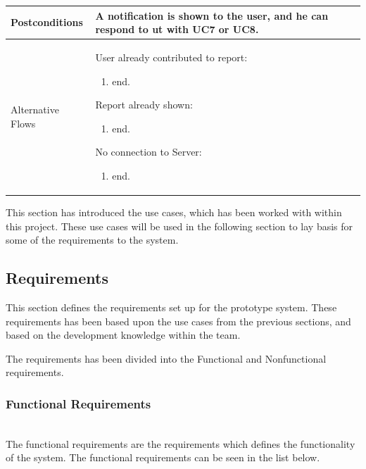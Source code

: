 \begin{table}[htb]
\begin{tabularx}{\textwidth}{|l|X|}
Postconditions    & A notification is shown to the user, and he can respond to ut with UC7 or UC8. \\ \hline
Alternative Flows & 
User already contributed to report:
{\footnotesize \begin{enumerate}
\item end.
\end{enumerate}}
Report already shown:
{\footnotesize \begin{enumerate}
\item end.
\end{enumerate}}
No connection to Server:
{\footnotesize \begin{enumerate}
\item end.
\end{enumerate}}
\\ \hline
\end{tabularx}
\end{table}

This section has introduced the use cases, which has been worked with within this project. These use cases will be used in the following section to lay basis for some of the requirements to the system.

\subsection{Requirements}
This section defines the requirements set up for the prototype system. These requirements has been based upon the use cases from the previous sections, and based on the development knowledge within the team.

The requirements has been divided into the Functional and Nonfunctional requirements.

\subsubsection{Functional Requirements}~\\
The functional requirements are the requirements which defines the functionality of the system. The functional requirements can be seen in the list below.


